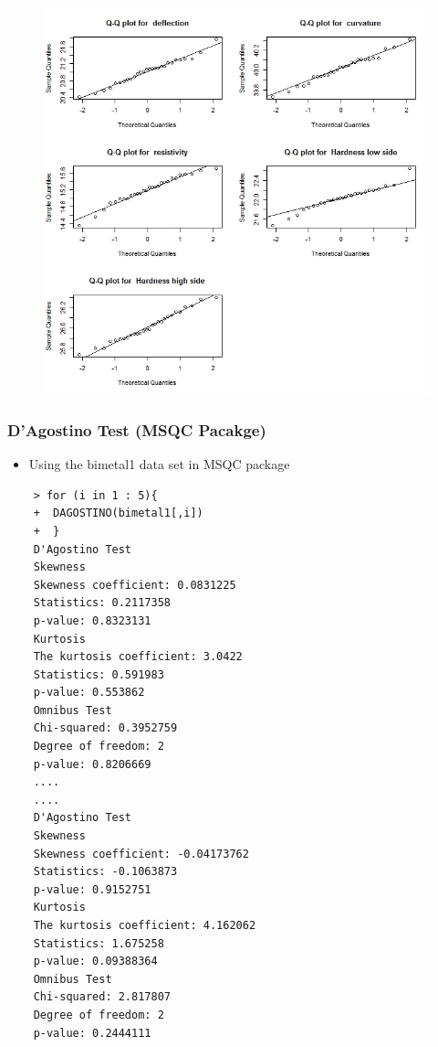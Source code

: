 \documentclass[]{report}
\begin{document}
\newpage
\begin{figure}[h!]
	\centering
	\includegraphics[width=0.9\linewidth]{images/MSQC-bimetal1qq}
	\caption{}
	\label{fig:MSQC-bimetal1qq}
\end{figure}
\newpage
\subsubsection{D'Agostino Test (MSQC Pacakge)}
\begin{itemize}
	\item Using the bimetal1 data set in MSQC package
\end{itemize}
\begin{framed}
	\begin{verbatim}
	> for (i in 1 : 5){
	+  DAGOSTINO(bimetal1[,i])
	+  }
	D'Agostino Test
	Skewness
	Skewness coefficient: 0.0831225 
	Statistics: 0.2117358 
	p-value: 0.8323131 
	Kurtosis
	The kurtosis coefficient: 3.0422 
	Statistics: 0.591983 
	p-value: 0.553862 
	Omnibus Test
	Chi-squared: 0.3952759 
	Degree of freedom: 2
	p-value: 0.8206669 
	....
	....
	D'Agostino Test
	Skewness
	Skewness coefficient: -0.04173762 
	Statistics: -0.1063873 
	p-value: 0.9152751 
	Kurtosis
	The kurtosis coefficient: 4.162062 
	Statistics: 1.675258 
	p-value: 0.09388364 
	Omnibus Test
	Chi-squared: 2.817807 
	Degree of freedom: 2
	p-value: 0.2444111 
	\end{verbatim}
\end{framed}
\newpage
\end{document}
